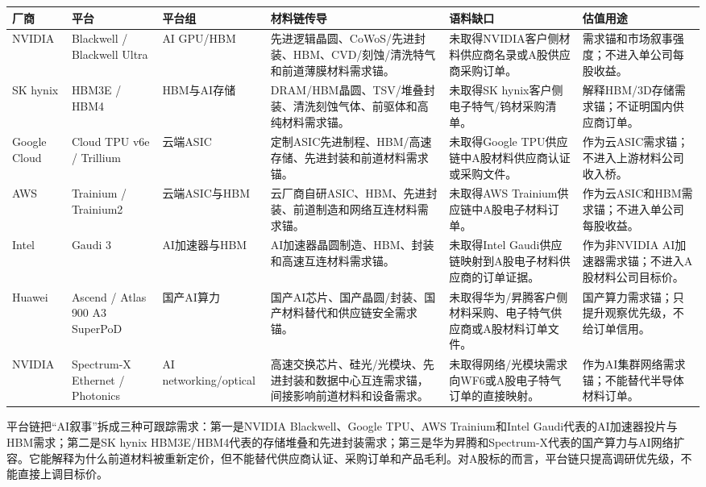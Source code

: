 \begin{exhibitbox}
\scriptsize
\begin{tabularx}{\exhibitboxwidth}{L{1.2cm} L{1.8cm} L{1.7cm} X X X}
\toprule
\textbf{厂商} & \textbf{平台} & \textbf{平台组} & \textbf{材料链传导} & \textbf{语料缺口} & \textbf{估值用途} \\
\midrule
NVIDIA & Blackwell / Blackwell Ultra & AI GPU/HBM & 先进逻辑晶圆、CoWoS/先进封装、HBM、CVD/刻蚀/清洗特气和前道薄膜材料需求锚。 & 未取得NVIDIA客户侧材料供应商名录或A股供应商采购订单。 & 需求锚和市场叙事强度；不进入单公司每股收益。 \\
SK hynix & HBM3E / HBM4 & HBM与AI存储 & DRAM/HBM晶圆、TSV/堆叠封装、清洗刻蚀气体、前驱体和高纯材料需求锚。 & 未取得SK hynix客户侧电子特气/钨材采购清单。 & 解释HBM/3D存储需求锚；不证明国内供应商订单。 \\
Google Cloud & Cloud TPU v6e / Trillium & 云端ASIC & 定制ASIC先进制程、HBM/高速存储、先进封装和前道材料需求锚。 & 未取得Google TPU供应链中A股材料供应商认证或采购文件。 & 作为云ASIC需求锚；不进入上游材料公司收入桥。 \\
AWS & Trainium / Trainium2 & 云端ASIC与HBM & 云厂商自研ASIC、HBM、先进封装、前道制造和网络互连材料需求锚。 & 未取得AWS Trainium供应链中A股电子材料订单。 & 作为云ASIC和HBM需求锚；不进入单公司每股收益。 \\
Intel & Gaudi 3 & AI加速器与HBM & AI加速器晶圆制造、HBM、封装和高速互连材料需求锚。 & 未取得Intel Gaudi供应链映射到A股电子材料供应商的订单证据。 & 作为非NVIDIA AI加速器需求锚；不进入A股材料公司目标价。 \\
Huawei & Ascend / Atlas 900 A3 SuperPoD & 国产AI算力 & 国产AI芯片、国产晶圆/封装、国产材料替代和供应链安全需求锚。 & 未取得华为/昇腾客户侧材料采购、电子特气供应商或A股材料订单文件。 & 国产算力需求锚；只提升观察优先级，不给订单信用。 \\
NVIDIA & Spectrum-X Ethernet / Photonics & AI networking/optical & 高速交换芯片、硅光/光模块、先进封装和数据中心互连需求锚，间接影响前道材料和设备需求。 & 未取得网络/光模块需求向WF6或A股电子特气订单的直接映射。 & 作为AI集群网络需求锚；不能替代半导体材料订单。 \\
\bottomrule
\end{tabularx}
\end{exhibitbox}

平台链把“AI叙事”拆成三种可跟踪需求：第一是NVIDIA Blackwell、Google TPU、AWS Trainium和Intel Gaudi代表的AI加速器投片与HBM需求；第二是SK hynix HBM3E/HBM4代表的存储堆叠和先进封装需求；第三是华为昇腾和Spectrum-X代表的国产算力与AI网络扩容。它能解释为什么前道材料被重新定价，但不能替代供应商认证、采购订单和产品毛利。对A股标的而言，平台链只提高调研优先级，不能直接上调目标价。

